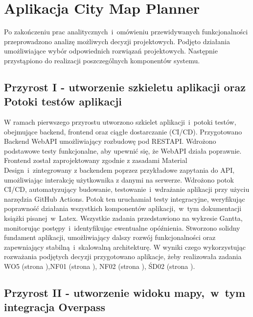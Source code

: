 \section{Aplikacja City Map Planner}
\label{sec:aplikacja}

Po zakończeniu prac analitycznych~i~omówieniu przewidywanych funkcjonalności przeprowadzono analizę możliwych decyzji projektowych. 
Podjęto działania umożliwiające wybór odpowiednich rozwiązań projektowych. 
Następnie przystąpiono do realizacji poszczególnych komponentów systemu.

\subsection{Przyrost I - utworzenie szkieletu aplikacji oraz Potoki testów aplikacji}
\label{sec:przyrost1}

W ramach pierwszego przyrostu utworzono szkielet aplikacji~i~potoki testów, obejmujące backend, frontend oraz ciągłe dostarczanie (CI/CD). \newline
\indent Przygotowano Backend WebAPI umożliwiający rozbudowę pod RESTAPI. Wdrożono podstawowe testy funkcjonalne, aby upewnić się, że WebAPI działa poprawnie.\newline
\indent Frontend został zaprojektowany zgodnie z zasadami Material Design~i~zintegrowany z backendem poprzez przykładowe zapytania do API, umożliwiając interakcję użytkownika z danymi na serwerze. \newline
\indent Wdrożono potok CI/CD, automatyzujący budowanie, testowanie~i~wdrażanie aplikacji przy użyciu narzędzia GitHub Actions. Potok ten uruchamiał testy integracyjne, weryfikując poprawność działania wszystkich komponentów aplikacji,~w~tym dokumentacji książki pisanej~w~Latex. \newline
\indent Wszystkie zadania przedstawiono na wykresie Gantta, monitorując postępy~i~identyfikując ewentualne opóźnienia. Stworzono solidny fundament aplikacji, umożliwiający dalszy rozwój funkcjonalności oraz zapewniający stabilną~i~skalowalną architekturę. \newline
W wyniki czego wykorzystując rozważania podjętych decyzji przygotowano aplikacje, żeby realizowała zadania WO5 (strona \pageref{tab:requirements:general5}),NF01 (strona \pageref{tab:requirements:nonfunc1}), NF02 (strona \pageref{tab:requirements:nonfunc2}), ŚD02 (strona \pageref{tab:requirements:envfunc2}).

\subsection{Przyrost II - utworzenie widoku mapy,~w~tym integracja  Overpass}
    \label{sec:przyrost2}

